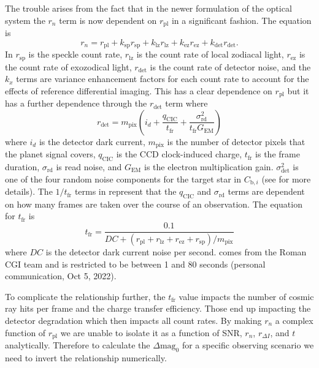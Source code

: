 The trouble arises from the fact that in the newer formulation of the optical
system the $r_n$ term is now dependent on $r_\textrm{pl}$ in a significant
fashion. The equation is
\begin{equation}
  r_n = r_\textrm{pl} + k_\textrm{sp} r_\textrm{sp} + k_\textrm{lz}
  r_\textrm{lz}+ k_\textrm{ez} r_\textrm{ez}+ k_\textrm{det} r_\textrm{det}.
  \label{eq:rn}
\end{equation}
In  $r_\textrm{sp}$ is the speckle count rate, $r_\textrm{lz}$ is the count
rate of local zodiacal light, $r_\textrm{ez}$ is the count rate of
exozodical light, $r_\textrm{det}$ is the count rate of detector noise, and the
$k_x$ terms are variance enhancement factors for each count rate to account for
the effects of reference differential imaging. This has a clear dependence on
$r_\textrm{pl}$ but it has a further dependence through the $r_\textrm{det}$ term
where
\begin{equation}
  r_\textrm{det} =  m_\textrm{pix}\left( i_d +
  \frac{q_\textrm{CIC}}{t_\textrm{fr}} +
\frac{\sigma^2_\textrm{rd}}{t_\textrm{fr} G_\textrm{EM}} \right)
  \label{eq:rdet}
\end{equation}
where $i_d$ is the detector dark current, $m_{\textrm{pix}}$ is the number of
detector pixels that the planet signal covers, $q_{\textrm{CIC}}$ is the CCD
clock-induced charge, $t_{\textrm{fr}}$ is the frame duration,
$\sigma_{\textrm{rd}}$ is read noise, and $G_{\textrm{EM}}$ is the electron
multiplication gain. $\sigma_{\textrm{det}}^2$ is one of the four random noise
components for the target star in $C_{\textrm{b},i}$ (see \citet{Nemati2020a}
for more details). The $1/t_{\textrm{fr}}$ terms in
 represent that the $q_\textrm{CIC}$
and $\sigma_\textrm{rd}$ terms are dependent on how many frames are taken over
the course of an observation. The equation for $t_\textrm{fr}$ is 
\begin{equation}
  t_{\textrm{fr}} = \frac{0.1}{DC +\left(r_{\textrm{pl}}+r_{\textrm{lz}}+r_{\textrm{ez}}+r_{\textrm{sp}}\right)/m_{\textrm{pix}}}
  \label{eq:bijan_frame_duration}
\end{equation}
where $DC$ is the detector dark current noise per second.
 comes from the Roman CGI team and is restricted
to be between 1 and 80 seconds (personal communication, Oct 5, 2022).

To complicate the relationship further, the $t_{\textrm{fr}}$ value impacts the
number of cosmic ray hits per frame and the charge transfer efficiency. Those
end up impacting the detector degradation which then impacts all count
rates. 
By making $r_n$ a complex function of $r_\textrm{pl}$ we are unable to isolate
it as a function of SNR, $r_n$, $r_{\Delta I}$, and $t$ analytically. Therefore
to calculate the $\Delta\textrm{mag}_0$ for a specific observing scenario we
need to invert the relationship numerically.


